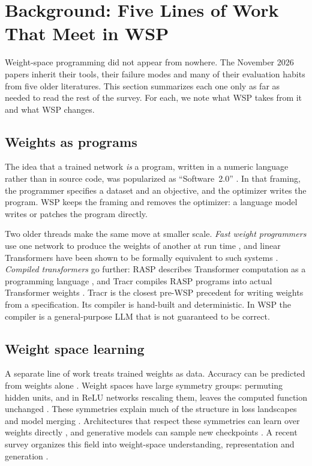 \section{Background: Five Lines of Work That Meet in WSP}
\label{sec:background}

Weight-space programming did not appear from nowhere. The November 2026 papers inherit their tools, their failure modes and many of their evaluation habits from five older literatures. This section summarizes each one only as far as needed to read the rest of the survey. For each, we note what WSP takes from it and what WSP changes.

\subsection{Weights as programs}

The idea that a trained network \emph{is} a program, written in a numeric language rather than in source code, was popularized as ``Software~2.0'' \citep{karpathy2017software}. In that framing, the programmer specifies a dataset and an objective, and the optimizer writes the program. WSP keeps the framing and removes the optimizer: a language model writes or patches the program directly.

Two older threads make the same move at smaller scale. \emph{Fast weight programmers} use one network to produce the weights of another at run time \citep{schmidhuber1992fastweights}, and linear Transformers have been shown to be formally equivalent to such systems \citep{ax2102_11174}. \emph{Compiled transformers} go further: RASP describes Transformer computation as a programming language \citep{ax2106_06981}, and Tracr compiles RASP programs into actual Transformer weights \citep{ax2301_05062}. Tracr is the closest pre-WSP precedent for writing weights from a specification. Its compiler is hand-built and deterministic. In WSP the compiler is a general-purpose LLM that is not guaranteed to be correct.

\subsection{Weight space learning}

A separate line of work treats trained weights as data. Accuracy can be predicted from weights alone \citep{ax2002_11448}. Weight spaces have large symmetry groups: permuting hidden units, and in ReLU networks rescaling them, leaves the computed function unchanged \citep{hechtnielsen1990algebraic}. These symmetries explain much of the structure in loss landscapes and model merging \citep{ax2110_06296,ax2209_04836}. Architectures that respect these symmetries can learn over weights directly \citep{ax2301_12780,ax2302_14040}, and generative models can sample new checkpoints \citep{ax2209_12892}. A recent survey organizes this field into weight-space understanding, representation and generation \citep{ax2603_10090}.

